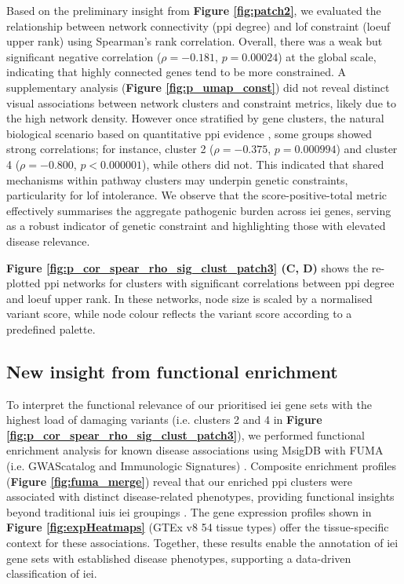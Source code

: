 Based on the preliminary insight from \textbf{Figure \ref{fig:patch2}},
we evaluated the relationship between network connectivity (\ac{ppi} degree) and \ac{lof} constraint (\ac{loeuf} upper rank) \citet{karczewski2020mutational} using Spearman’s rank correlation.
Overall, there was a weak but significant negative correlation ($\rho = -0.181$, $p = 0.00024$) at the global scale, indicating that highly connected genes tend to be more constrained. 
A supplementary analysis (\textbf{Figure \ref{fig:p_umap_const}})
did not reveal distinct visual associations between network clusters and constraint metrics, likely due to the high network density. 
However once stratified by gene clusters, the natural biological scenario based on quantitative \ac{ppi} evidence \cite{szklarczyk2025string},
some groups showed strong correlations; for instance, cluster 2 ($\rho = -0.375$, $p = 0.000994$) and cluster 4 ($\rho = -0.800$, $p < 0.000001$), while others did not.
This indicated that shared mechanisms within pathway clusters may underpin genetic constraints, particularity for \ac{lof} intolerance. We observe that the score-positive-total metric effectively summarises the aggregate pathogenic burden across \ac{iei} genes, serving as a robust indicator of genetic constraint and highlighting those with elevated disease relevance.


\textbf{Figure \ref{fig:p_cor_spear_rho_sig_clust_patch3} (C, D)} shows the re-plotted \ac{ppi} networks for clusters with significant correlations between \ac{ppi} degree and \ac{loeuf} upper rank. In these networks, node size is scaled by a normalised variant score, while node colour reflects the variant score according to a predefined palette.

\subsection{New insight from functional enrichment}
To interpret the functional relevance of our prioritised \ac{iei} gene sets with the highest load of damaging variants (i.e. clusters 2 and 4 in \textbf{Figure \ref{fig:p_cor_spear_rho_sig_clust_patch3}}), we performed functional enrichment analysis for known disease associations using MsigDB with FUMA (i.e. GWAScatalog and Immunologic Signatures) \cite{watanabe_functional_2017}. Composite enrichment profiles (\textbf{Figure \ref{fig:fuma_merge}}) reveal that our enriched \ac{ppi} clusters were associated with distinct disease-related phenotypes, providing functional insights beyond traditional \ac{iuis} \ac{iei} groupings \cite{poli_human_2025}. The gene expression profiles shown in \textbf{Figure \ref{fig:expHeatmaps}} (GTEx v8 54 tissue types) offer the tissue-specific context for these associations. Together, these results enable the annotation of \ac{iei} gene sets with established disease phenotypes, supporting a data-driven classification of \ac{iei}.

